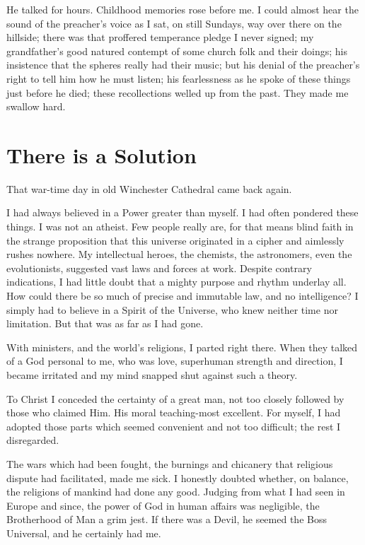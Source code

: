 He talked for hours.
Childhood memories rose before me.
I could almost hear the sound of the preacher's voice as I sat, on still Sundays, way over there on the hillside;
there was that proffered temperance pledge I never signed;
my grandfather's good natured contempt of some church folk and their doings;
his insistence that the spheres really had their music;
but his denial of the preacher's right to tell him how he must listen; 
his fearlessness as he spoke of these things just before he died; 
these recollections welled up from the past.
They made me swallow hard.


\section{There is a Solution}

That war-time day in old Winchester Cathedral came back again.

I had always believed in a Power greater than myself.
I had often pondered these things.
I was not an atheist.
Few people really are, for that means blind faith in the strange proposition that this universe originated in a cipher and aimlessly rushes nowhere.
My intellectual heroes, the chemists, the astronomers, even the evolutionists, suggested vast laws and forces at work.
Despite contrary indications, I had little doubt that a mighty purpose and rhythm underlay all.
How could there be so much of precise and immutable law, and no intelligence?
I simply had to believe in a Spirit of the Universe, who knew neither time nor limitation.
But that was as far as I had gone.

With ministers, and the world's religions, I parted right there.
When they talked of a God personal to me, who was love, superhuman strength and direction, I became irritated and my mind snapped shut against such a theory.

To Christ I conceded the certainty of a great man, not too closely followed by those who claimed Him.
His moral teaching-most excellent.
For myself, I had adopted those parts which seemed convenient and not too difficult;
the rest I disregarded.

The wars which had been fought, the burnings and chicanery that religious dispute had facilitated, made me sick.
I honestly doubted whether, on balance, the religions of mankind had done any good.
Judging from what I had seen in Europe and since, the power of God in human affairs was negligible, the Brotherhood of Man a grim jest.
If there was a Devil, he seemed the Boss Universal, and he certainly had me.

